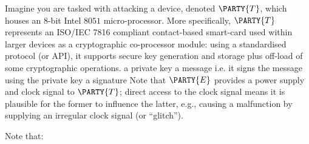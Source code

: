 %



Imagine you are tasked with attacking a device, denoted 
$\PARTY{T}$, 
which houses an $8$-bit Intel $8051$ micro-processor.  More specifically,
$\PARTY{T}$ 
represents an ISO/IEC 7816 compliant contact-based smart-card used within 
larger devices as a cryptographic co-processor module: 
using a standardised protocol (or API), it supports secure key generation 
and storage plus off-load of some cryptographic operations.
{a private key}
{a message}
{i.e. it signs the message using the private key}
{a signature}
Note that
$\PARTY{E}$ 
provides a power supply and clock signal to 
$\PARTY{T}$;
direct access to the 
clock signal
means it is plausible 
for the former to influence the latter, e.g., causing a malfunction by supplying an irregular clock signal (or ``glitch'').




%
Note that:

